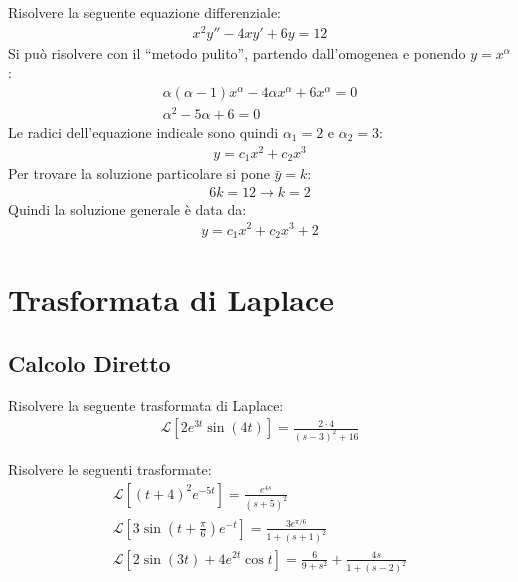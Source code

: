 \documentclass{article}
\numberwithin{equation}{subsection}
\begin{document}
Risolvere la seguente equazione differenziale:
\begin{gather*}
    x^2y''-4xy'+6y=12
\end{gather*}
Si può risolvere con il ``metodo pulito'', partendo dall'omogenea e ponendo $y=x^{\alpha}$:
\begin{gather*}
    \alpha(\alpha-1)x^{\alpha}-4\alpha x^\alpha+6x^\alpha=0\\
    \alpha^2-5\alpha+6=0
\end{gather*}
Le radici dell'equazione indicale sono quindi $\alpha_1=2$ e $\alpha_2=3$:
\begin{gather*}
    y=c_1x^{2}+c_2x^{3}
\end{gather*}
Per trovare la soluzione particolare si pone $\bar{y}=k$:
\begin{gather*}
    6k=12\to k=2
\end{gather*}
Quindi la soluzione generale è data da:
\begin{gather*}
    y=c_1x^{2}+c_2x^{3}+2
\end{gather*}



\clearpage

\section{Trasformata di Laplace}

\subsection{Calcolo Diretto}


Risolvere la seguente trasformata di Laplace:
\begin{gather*}
    \mathcal{L}[2e^{3t}\sin(4t)]=\frac{2\cdot4}{(s-3)^2+16}
\end{gather*}


Risolvere le seguenti trasformate:
\begin{gather*}
    \mathcal{L}[(t+4)^2e^{-5t}]=\frac{e^{4s}}{(s+5)^2}\\
    \mathcal{L}\left[3\sin\left(t+\frac{\pi}{6}\right)e^{-t}\right]=\frac{3e^{\pi/6}}{1+(s+1)^2}\\
    \mathcal{L}\left[2\sin(3t)+4e^{2t}\cos t\right]=\frac{6}{9+s^2}+\frac{4s}{1+(s-2)^2}
\end{gather*}
\end{document}
